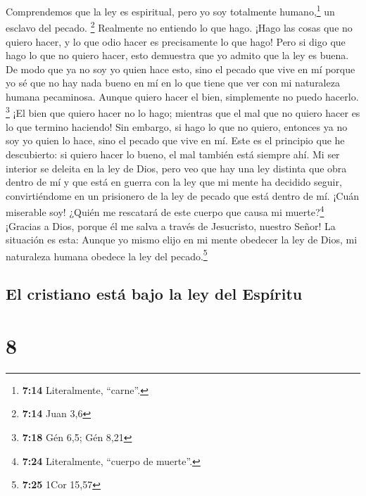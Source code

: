  Comprendemos que la ley es espiritual, pero yo soy
totalmente humano,\footnote{\textbf{7:14} Literalmente, ``carne''.} un
esclavo del pecado. \footnote{\textbf{7:14} Juan 3,6} 
Realmente no entiendo lo que hago. ¡Hago las cosas que no quiero hacer,
y lo que odio hacer es precisamente lo que hago!  Pero si
digo que hago lo que no quiero hacer, esto demuestra que yo admito que
la ley es buena.  De modo que ya no soy yo quien hace
esto, sino el pecado que vive en mí  porque yo sé que no
hay nada bueno en mí en lo que tiene que ver con mi naturaleza humana
pecaminosa. Aunque quiero hacer el bien, simplemente no puedo hacerlo.
\footnote{\textbf{7:18} Gén 6,5; Gén 8,21}  ¡El bien que
quiero hacer no lo hago; mientras que el mal que no quiero hacer es lo
que termino haciendo!  Sin embargo, si hago lo que no
quiero, entonces ya no soy yo quien lo hace, sino el pecado que vive en
mí.  Este es el principio que he descubierto: si quiero
hacer lo bueno, el mal también está siempre ahí.  Mi ser
interior se deleita en la ley de Dios,  pero veo que hay
una ley distinta que obra dentro de mí y que está en guerra con la ley
que mi mente ha decidido seguir, convirtiéndome en un prisionero de la
ley de pecado que está dentro de mí.  ¡Cuán miserable
soy! ¿Quién me rescatará de este cuerpo que causa mi muerte?\footnote{\textbf{7:24}
  Literalmente, ``cuerpo de muerte''.} ¡Gracias a Dios, porque él me
salva a través de Jesucristo, nuestro Señor!  La
situación es esta: Aunque yo mismo elijo en mi mente obedecer la ley de
Dios, mi naturaleza humana obedece la ley del pecado.\footnote{\textbf{7:25}
  1Cor 15,57}

\hypertarget{el-cristiano-estuxe1-bajo-la-ley-del-espuxedritu}{%
\subsection{El cristiano está bajo la ley del
Espíritu}\label{el-cristiano-estuxe1-bajo-la-ley-del-espuxedritu}}

\hypertarget{section-7}{%
\section{8}\label{section-7}}

